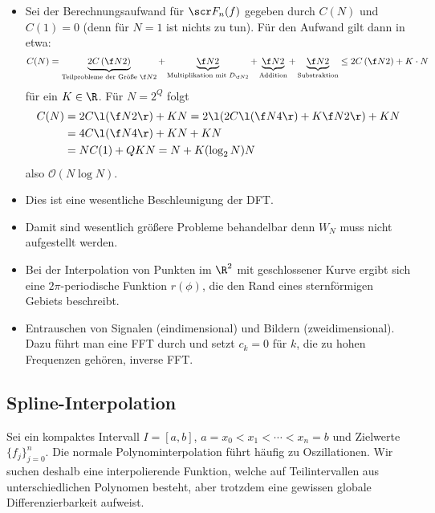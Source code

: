 \documentclass[11pt]{scrartcl}
\begin{document}
\begin{nt*}[Aufwandsbetrachtung]
		\begin{itemize}
			\item
				Sei der Berechnungsaufwand für $\scr F_n(f)$ gegeben durch $C(N)$ und $C(1)=0$ (denn für $N=1$ ist nichts zu tun).
				Für den Aufwand gilt dann in etwa:
				\[
					C(N) = \underbrace{2C\left(\f N2\right)}_{\text{Teilprobleme der Größe $\f N2$}} + \underbrace{\f N2}_{\text{Multiplikation mit $D_{\f N2}$}} + \underbrace{\f N2}_{\text{Addition}} + \underbrace{\f N2}_{\text{Substraktion}} \le 2 C\left(\f N2\right) + K\cdot N
				\]
				für ein $K\in \R$.
				Für $N=2^Q$ folgt
				\begin{align*}
					C(N) &= 2C\l(\f N2\r) + KN = 2\l(2C\l(\f N4\r) + K\f N2\r) + KN \\
					&= 4C\l(\f N4\r) + KN + KN \\
					&= NC(1) + QKN = N + K(\log_2 N)N 
				\end{align*}
				also $\mathcal O(N\log N)$.
			\item
				Dies ist eine wesentliche Beschleunigung der DFT.
			\item
				Damit sind wesentlich größere Probleme behandelbar denn $W_N$ muss nicht aufgestellt werden.
		\end{itemize}
\end{nt*}

\begin{nt*}
	\begin{itemize}
		\item
			Bei der Interpolation von Punkten im $\R^2$ mit geschlossener Kurve ergibt sich eine $2\pi$-periodische Funktion $r(\phi)$, die den Rand eines sternförmigen Gebiets beschreibt.
		\item
			Entrauschen von Signalen (eindimensional) und Bildern (zweidimensional).
			Dazu führt man eine FFT durch und setzt $c_k= 0$ für $k$, die zu hohen Frequenzen gehören, inverse FFT.
	\end{itemize}
\end{nt*}


\subsection{Spline-Interpolation}


Sei ein kompaktes Intervall $I=[a,b]$, $a=x_0<x_1 < \dotsb < x_n = b$ und Zielwerte $\{f_j\}_{j=0}^n$.
Die normale Polynominterpolation führt häufig zu Oszillationen.
Wir suchen deshalb eine interpolierende Funktion, welche auf Teilintervallen aus unterschiedlichen Polynomen besteht, aber trotzdem eine gewissen globale Differenzierbarkeit aufweist.
\end{document}
